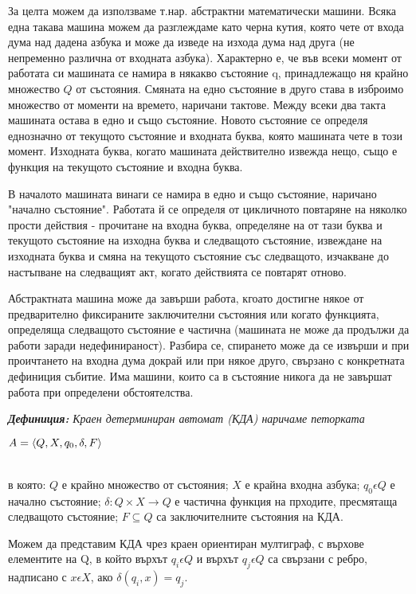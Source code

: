 \documentclass[11pt]{article} %
\begin{document}
За целта можем да използваме т.нар. абстрактни математически машини. Всяка една такава машина можем да разглеждаме като черна кутия, която чете от входа дума над дадена азбука и може да изведе на изхода дума над друга (не непременно различна от входната азбука). Характерно е, че във всеки момент от работата си машината се намира в някакво състояние q, принадлежащо ня крайно множество $Q$ от състояния. Смяната на едно състояние в друго става в изброимо множество от моменти на времето, наричани тактове. Между всеки два такта машината остава в едно и също състояние. Новото състояние се определя еднозначно от текущото състояние и входната буква, която машината чете в този момент. Изходната буква, когато машината действително извежда нещо, също е функция на текущото състояние и входна буква. \par

В началото машината винаги се намира в едно и също състояние, наричано "начално състояние". Работата й се определя от цикличното повтаряне на няколко прости действия - прочитане на входна буква, определяне на от тази буква и текущото състояние на изходна буква и следващото състояние, извеждане на изходната буква и смяна на текущото състояние със следващото, изчакване до настъпване на следващият акт, когато действията се повтарят отново. \par

Абстрактната машина може да завърши работа, кгоато достигне някое от предварително фиксираните заключителни състояния или когато функцията, определяща следващото състояние е частична (машината не може да продължи да работи заради недефинираност). Разбира се, спирането може да се извърши и при проичтането на входна дума докрай или при някое друго, свързано с конкретната дефиниция събитие. Има машини, които са в състояние никога да не завършат работа при определени обстоятелства. \par 

\textbf{\emph{Дефиниция:}} \emph{Краен детерминиран автомат (КДА) наричаме петорката} \\
\centerline{$A = \left\langle Q, X, q_{0}, \delta, F \right\rangle$}\\
в която: $Q$ е крайно множество от състояния; $X$ е крайна входна азбука; $q_{0} \epsilon Q$ е начално състояние; 
$\delta : Q \times X \to Q$ е частична функция на прходите, пресмятаща следващото състояние; $F \subseteq Q$ са заключителните състояния на КДА. \par

Можем да представим КДА чрез краен ориентиран мултиграф, с върхове елементите на Q, в който върхът $q_{i} \epsilon Q$ и върхът $q_{j} \epsilon Q$ са свързани с ребро, надписано с $x \epsilon X$, ако $\delta(q_{i}, x) = q_{j}$. \\
\end{document}
